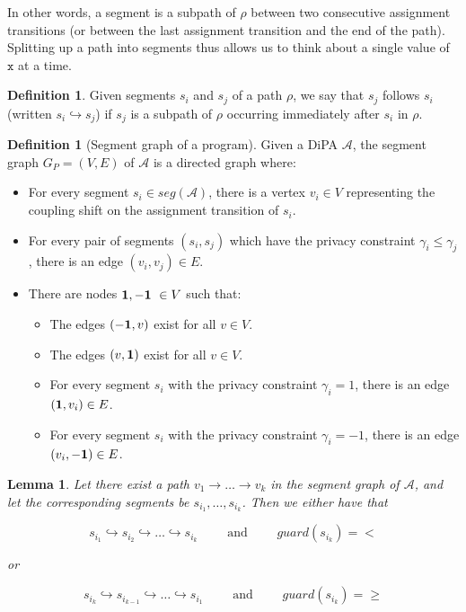 \documentclass[12pt]{article}
\newtheorem{lemma}[thm]{Lemma}
\theoremstyle{definition}
\newtheorem{defn}[thm]{Definition}
\begin{document}
In other words, a segment is a subpath of $\rho$ between two consecutive assignment transitions (or between the last assignment transition and the end of the path). Splitting up a path into segments thus allows us to think about a single value of $\texttt{x}$ at a time.



\begin{defn}
    Given segments $s_i$ and $s_j$ of a path $\rho$, we say that $s_j$ follows $s_i$ (written $s_i \hookrightarrow s_j$) if $s_j$ is a subpath of $\rho$ occurring immediately after $s_i$ in $\rho$.
\end{defn}


\begin{defn}[Segment graph of a program]
    Given a DiPA $\mathcal{A}$, the segment graph $G_P = (V, E)$ of $\mathcal{A}$ is a directed graph where: 
    \begin{itemize}
        \item For every segment $s_i \in seg(\mathcal{A})$, there is a vertex $v_i \in V$ representing the coupling shift on the assignment transition of $s_i$.
        \item For every pair of segments $(s_i, s_j)$ which have the privacy constraint $\gamma_i \leq \gamma_j$, there is an edge $(v_i, v_j) \in E$.
        \item There are nodes ${\bf 1, -1}\ \in V$ such that: 
        \begin{itemize}
            \item The edges $({\bf -1}, v)$ exist for all $v \in V$.
            \item The edges $(v, {\bf 1})$ exist for all $v \in V$.
            \item For every segment $s_i$ with the privacy constraint $\gamma_i = 1$, there is an edge $({\bf 1}, v_i) \in E$.
            \item For every segment $s_i$ with the privacy constraint $\gamma_i = -1$, there is an edge $(v_i, {\bf -1}) \in E$. 
        \end{itemize}
    \end{itemize}
\end{defn}

\begin{lemma}
    \label{lemma:segpath}
    Let there exist a path $v_1 \to \dots \to v_k$ in the segment graph of $\mathcal{A}$, and let the corresponding segments be $s_{i_1}, \dots, s_{i_k}$. Then we either have that 
    
    \[s_{i_1} \hookrightarrow s_{i_2} \hookrightarrow \dots \hookrightarrow s_{i_k} \qquad \text{ and } \qquad guard(s_{i_k}) = <\]
    
    or 
    
    \[s_{i_k} \hookrightarrow s_{i_{k - 1}} \hookrightarrow \dots \hookrightarrow s_{i_1} \qquad \text{ and } \qquad guard(s_{i_k}) = \geq\]
\end{lemma}
\end{document}
